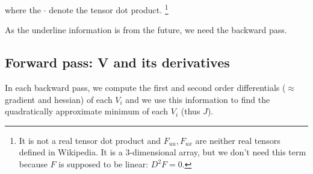 \documentclass{report}
\begin{document}
where the $\cdot$ denote the tensor dot product.
\footnote{It is not a real tensor dot product and $F_{uu}, F_{ux}$ are neither real tensors defined in Wikipedia. It is a 3-dimensional array, but we don't need this term because $F$ is supposed to be linear: $D^2F = 0$.}


As the underline information is from the future, we need the backward pass.

\subsection{Forward pass: V and its derivatives}
In each backward pass, we compute the first and second order differentials ($\approx$gradient and hessian) of each $V_i$ and we use this information to find the quadratically approximate minimum of each $V_i$ (thus $J$).%
\end{document}
